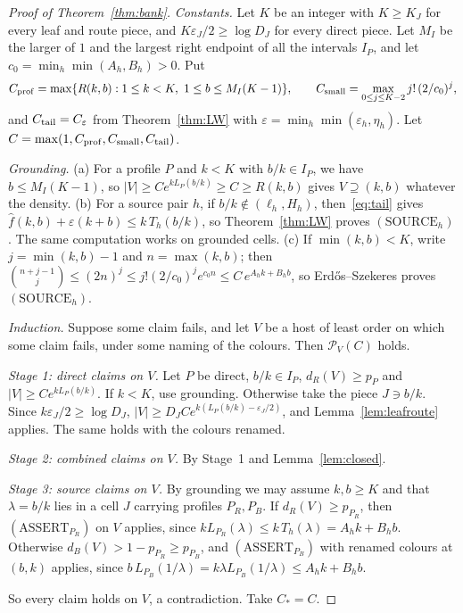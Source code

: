 \documentclass[11pt]{article}
\theoremstyle{definition}
\theoremstyle{remark}
\newcommand{\fh}{\widehat f}
\begin{document}
\begin{proof}[Proof of Theorem~\ref{thm:bank}]
\emph{Constants.} Let $K$ be an integer with $K\ge K_J$ for every leaf and route piece, and
$K\varepsilon_J/2\ge\log D_J$ for every direct piece. Let $M_I$ be the larger of $1$ and the largest right endpoint of all the
intervals $I_P$, and let $c_0=\min_h\min(A_h,B_h)>0$. Put
\[
C_{\rm prof}=\max\{R(k,b):1\le k<K,\ 1\le b\le M_I(K-1)\},\qquad
C_{\rm small}=\max_{0\le j\le K-2}j!\,(2/c_0)^j,
\]
and $C_{\rm tail}=C_\varepsilon$ from Theorem~\ref{thm:LW} with
$\varepsilon=\min_h\min(\varepsilon_h,\eta_h)$. Let $C=\max(1,C_{\rm prof},C_{\rm small},C_{\rm tail})$.

\emph{Grounding.} (a) For a profile $P$ and $k<K$ with $b/k\in I_P$, we have $b\le M_I(K-1)$, so
$|V|\ge Ce^{kL_P(b/k)}\ge C\ge R(k,b)$ gives $V\supseteq(k,b)$ whatever the density. (b) For a source pair $h$,
if $b/k\notin(\ell_h,H_h)$, then~\eqref{eq:tail} gives $\fh(k,b)+\varepsilon(k+b)\le k\,T_h(b/k)$, so
Theorem~\ref{thm:LW} proves $(\mathrm{SOURCE}_h)$. The same computation works on grounded cells. (c) If
$\min(k,b)<K$, write $j=\min(k,b)-1$ and $n=\max(k,b)$; then
$\binom{n+j-1}j\le(2n)^j\le j!(2/c_0)^je^{c_0n}\le C\,e^{A_hk+B_hb}$, so Erd\H{o}s--Szekeres proves
$(\mathrm{SOURCE}_h)$.

\emph{Induction.} Suppose some claim fails, and let $V$ be a host of least order on which some claim fails, under some
naming of the colours. Then $\mathcal P_V(C)$ holds.

\emph{Stage 1: direct claims on $V$.} Let $P$ be direct, $b/k\in I_P$, $d_R(V)\ge p_P$ and $|V|\ge Ce^{kL_P(b/k)}$. If $k<K$,
use grounding. Otherwise take the piece $J\ni b/k$. Since $k\varepsilon_J/2\ge\log D_J$,
$|V|\ge D_JCe^{k(L_P(b/k)-\varepsilon_J/2)}$, and Lemma~\ref{lem:leafroute} applies. The same holds with the colours
renamed.

\emph{Stage 2: combined claims on $V$.} By Stage~1 and Lemma~\ref{lem:closed}.

\emph{Stage 3: source claims on $V$.} By grounding we may assume $k,b\ge K$ and that $\lambda=b/k$ lies in a cell $J$
carrying profiles $P_R,P_B$. If $d_R(V)\ge p_{P_R}$, then $(\mathrm{ASSERT}_{P_R})$ on $V$ applies, since
$kL_{P_R}(\lambda)\le k\,T_h(\lambda)=A_hk+B_hb$. Otherwise $d_B(V)>1-p_{P_R}\ge p_{P_B}$, and $(\mathrm{ASSERT}_{P_B})$
with renamed colours at $(b,k)$ applies, since $b\,L_{P_B}(1/\lambda)=k\lambda L_{P_B}(1/\lambda)\le A_hk+B_hb$.

So every claim holds on $V$, a contradiction. Take $C_*=C$.
\end{proof}
\end{document}
